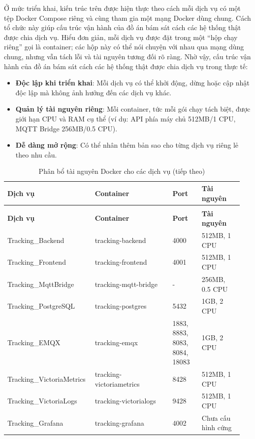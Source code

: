 \documentclass[a4paper]{extarticle}
\newcommand{\thesissettableid}[2]{%
  \renewcommand{\thetable}{#1}%
  \renewcommand{\theHtable}{#2}%
}
\providecommand{\tightlist}{%
  \setlength{\itemsep}{0pt}\setlength{\parskip}{0pt}}
\begin{document}
Ở mức triển khai, kiến trúc trên được hiện thực theo cách mỗi dịch vụ có
một tệp Docker Compose riêng và cùng tham gia một mạng Docker dùng chung.
Cách tổ chức này giúp cấu
trúc vận hành của đồ án bám sát cách các hệ thống thật được chia dịch vụ.
Hiểu đơn giản, mỗi dịch vụ được đặt trong một ``hộp chạy riêng'' gọi là
container; các hộp này có thể nói chuyện với nhau qua mạng dùng chung,
nhưng vẫn tách lỗi và tài nguyên tương đối rõ ràng. Nhờ vậy, cấu trúc
vận hành của đồ án bám sát cách các hệ thống thật được chia dịch vụ
trong thực tế:

\begin{itemize}
\tightlist
\item
  \textbf{Độc lập khi triển khai}: Mỗi dịch vụ có thể khởi động, dừng
  hoặc cập nhật độc lập mà không ảnh hưởng đến các dịch vụ khác.
\item
  \textbf{Quản lý tài nguyên riêng}: Mỗi container, tức mỗi gói chạy tách
  biệt, được giới hạn CPU và RAM cụ thể (ví dụ: API phía máy chủ
  512MB/1 CPU, MQTT Bridge 256MB/0.5 CPU).
\item
  \textbf{Dễ dàng mở rộng}: Có thể nhân thêm bản sao cho từng dịch vụ riêng
  lẻ theo nhu cầu.
\end{itemize}


{\thesissettableid{3.16}{tab-ch3-phan-bo-tai-nguyen-docker-cho-cac-dich-vu}
\def\LTcaptype{table}
\begin{longtable}{|L{0.326\linewidth}|L{0.327\linewidth}|L{0.128\linewidth}|L{0.173\linewidth}|}
\caption{Phân bổ tài nguyên Docker cho các dịch vụ}\label{tab:ch3-phan-bo-tai-nguyen-docker-cho-cac-dich-vu}\\
\hline \textbf{Dịch vụ} & \textbf{Container} & \textbf{Port} & \textbf{Tài nguyên} \\
\hline
\endfirsthead
\caption[]{Phân bổ tài nguyên Docker cho các dịch vụ (tiếp theo)}\\
\hline \textbf{Dịch vụ} & \textbf{Container} & \textbf{Port} & \textbf{Tài nguyên} \\
\hline
\endhead
\hline
\endfoot
\endlastfoot
Tracking\_Backend & tracking-backend & 4000 & 512MB, 1 CPU \\\hline
Tracking\_Frontend & tracking-frontend & 4001 & 512MB, 1 CPU \\\hline
Tracking\_MqttBridge & tracking-mqtt-bridge & - & 256MB, 0.5 CPU \\\hline
Tracking\_PostgreSQL & tracking-postgres & 5432 & 1GB, 2 CPU \\\hline
Tracking\_EMQX & tracking-emqx & 1883, 8883, 8083, 8084, 18083 & 1GB, 2
CPU \\\hline
Tracking\_VictoriaMetrics & tracking-victoriametrics & 8428 & 512MB, 1
CPU \\\hline
Tracking\_VictoriaLogs & tracking-victorialogs & 9428 & 512MB, 1 CPU \\\hline
Tracking\_Grafana & tracking-grafana & 4002 & Chưa cấu hình cứng \\\hline
\end{longtable}
}
\end{document}
